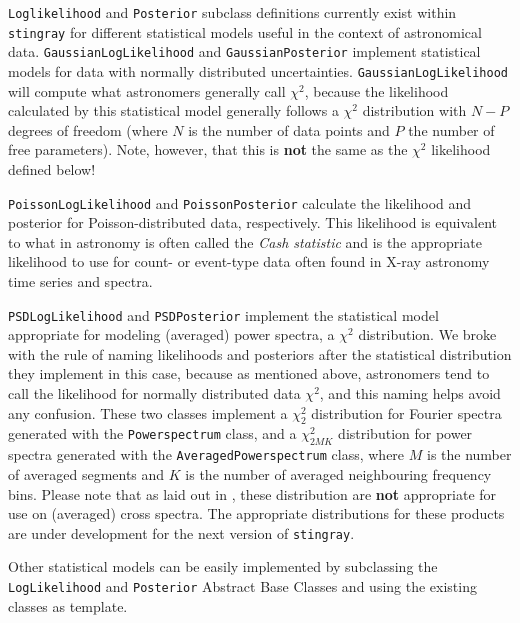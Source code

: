 \documentclass[twocolumn]{aastex62}
\newcommand{\stingray}{\texttt{stingray}\xspace}
\newcommand{\powerspectrum}{\texttt{Powerspectrum}\xspace}
\begin{document}
\texttt{Loglikelihood} and \texttt{Posterior} subclass definitions currently exist within \stingray for different statistical models useful in the context of astronomical data. 
\verb|GaussianLogLikelihood| and \texttt{GaussianPosterior} implement statistical models for data with normally distributed uncertainties. \texttt{GaussianLogLikelihood} will compute what astronomers generally call $\chi^2$, because the likelihood calculated by this statistical model generally follows a $\chi^2$ distribution with $N-P$ degrees of freedom (where $N$ is the number of data points and $P$ the number of free parameters). Note, however, that this is \textbf{not} the same as the $\chi^2$ likelihood defined below!

\texttt{PoissonLogLikelihood} and \texttt{PoissonPosterior} calculate the likelihood and posterior for Poisson-distributed data, respectively. This likelihood is equivalent to what in astronomy is often called the \textit{Cash statistic} \citep{cash1979} and is the appropriate likelihood to use for count- or event-type data often found in X-ray astronomy time series and spectra.

\texttt{PSDLogLikelihood} and \texttt{PSDPosterior} implement the statistical model appropriate for modeling (averaged) power spectra, a $\chi^2$ distribution. 
We broke with the rule of naming likelihoods and posteriors after the statistical distribution they implement in this case, because as mentioned above, astronomers tend to call the likelihood for normally distributed data $\chi^2$, and this naming helps avoid any confusion. 
These two classes implement a $\chi^2_2$ distribution for Fourier spectra generated with the \powerspectrum class, and a $\chi^2_{2MK}$ distribution for power spectra generated with the \texttt{AveragedPowerspectrum} class, where $M$ is the number of averaged segments and $K$ is the number of averaged neighbouring frequency bins. 
Please note that as laid out in \citet{huppenkothen2017}, these distribution are \textbf{not} appropriate for use on (averaged) cross spectra. 
The appropriate distributions for these products are under development for the next version of \stingray.

Other statistical models can be easily implemented by subclassing the \texttt{LogLikelihood} and \texttt{Posterior} Abstract Base Classes and using the existing classes as template.
\end{document}
